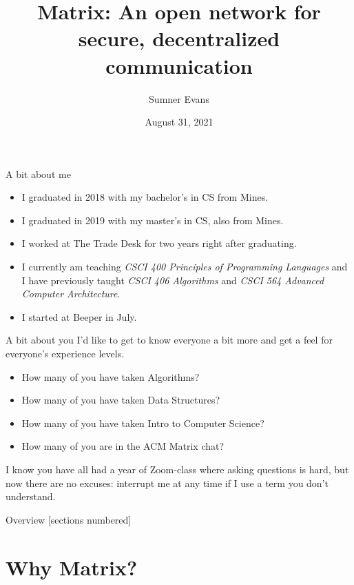 \documentclass{acm}
\title{Matrix: An open network for secure, decentralized communication}
\author{Sumner Evans}
\date{August 31, 2021}
\institute{Beeper}
\begin{document}
\begin{frame}{A bit about me}
    \begin{itemize}
        \item I graduated in 2018 with my bachelor's in CS from Mines.
        \item I graduated in 2019 with my master's in CS, also from Mines.
        \item I worked at The Trade Desk for two years right after graduating.
        \item I currently am teaching \textit{CSCI 400 Principles of Programming
            Languages} and I have previously taught \textit{CSCI 406 Algorithms}
            and \textit{CSCI 564 Advanced Computer Architecture}.
        \item I started at Beeper in July.
    \end{itemize}
\end{frame}

\begin{frame}{A bit about you}
    I'd like to get to know everyone a bit more and get a feel for everyone's
    experience levels.
    \pause

    \begin{itemize}[<+->]
        \item How many of you have taken Algorithms?
        \item How many of you have taken Data Structures?
        \item How many of you have taken Intro to Computer Science?
        \item How many of you are in the ACM Matrix chat?
    \end{itemize}
    \pause[\thebeamerpauses]

    I know you have all had a year of Zoom-class where asking questions is hard,
    but now there are no excuses: interrupt me at any time if I use a term you
    don't understand.
\end{frame}

\begin{frame}{Overview}
    [sections numbered]
    \tableofcontents[hideallsubsections]
\end{frame}

\section{Why Matrix?}
\end{document}
